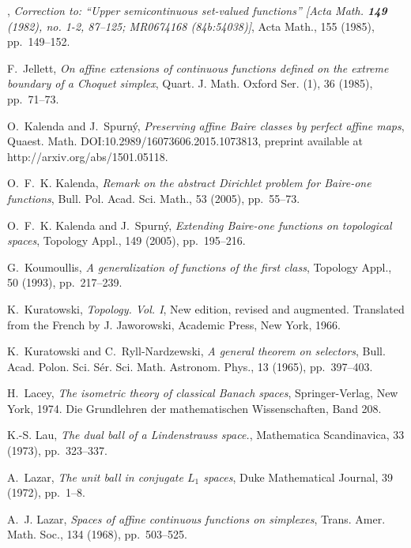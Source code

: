 \documentclass{amsart}
\numberwithin{equation}{section}
\theoremstyle{definition}
\begin{document}
\begin{thebibliography}{10}
\leavevmode\vrule height 2pt depth -1.6pt width 23pt, {\em Correction to:
  ``{U}pper semicontinuous set-valued functions'' [{A}cta {M}ath. {\bf 149}
  (1982), no. 1-2, 87--125; {MR}0674168 (84b:54038)]}, Acta Math., 155 (1985),
  pp.~149--152.

{\sc F.~Jellett}, {\em On affine extensions of continuous functions defined on
  the extreme boundary of a {C}hoquet simplex}, Quart. J. Math. Oxford Ser.
  (1), 36 (1985), pp.~71--73.

{\sc O.~Kalenda and J.~Spurn\'y}, {\em Preserving affine {B}aire classes by
  perfect affine maps}, Quaest. Math.
\newblock DOI:10.2989/16073606.2015.1073813, preprint available at
  http://arxiv.org/abs/1501.05118.

{\sc O.~F.~K. Kalenda}, {\em Remark on the abstract {D}irichlet problem for
  {B}aire-one functions}, Bull. Pol. Acad. Sci. Math., 53 (2005), pp.~55--73.

{\sc O.~F.~K. Kalenda and J.~Spurn{\'y}}, {\em Extending {B}aire-one functions
  on topological spaces}, Topology Appl., 149 (2005), pp.~195--216.

{\sc G.~Koumoullis}, {\em A generalization of functions of the first class},
  Topology Appl., 50 (1993), pp.~217--239.

{\sc K.~Kuratowski}, {\em Topology. {V}ol. {I}}, New edition, revised and
  augmented. Translated from the French by J. Jaworowski, Academic Press, New
  York, 1966.

{\sc K.~Kuratowski and C.~Ryll-Nardzewski}, {\em A general theorem on
  selectors}, Bull. Acad. Polon. Sci. S\'er. Sci. Math. Astronom. Phys., 13
  (1965), pp.~397--403.

{\sc H.~Lacey}, {\em The isometric theory of classical {B}anach spaces},
  Springer-Verlag, New York, 1974.
\newblock Die Grundlehren der mathematischen Wissenschaften, Band 208.

{\sc K.-S. Lau}, {\em The dual ball of a {L}indenstrauss space.}, Mathematica
  Scandinavica, 33 (1973), pp.~323--337.

{\sc A.~Lazar}, {\em The unit ball in conjugate {$L_1$} spaces}, Duke
  Mathematical Journal, 39 (1972), pp.~1--8.

{\sc A.~J. Lazar}, {\em Spaces of affine continuous functions on simplexes},
  Trans. Amer. Math. Soc., 134 (1968), pp.~503--525.


\end{thebibliography}
\end{document}

